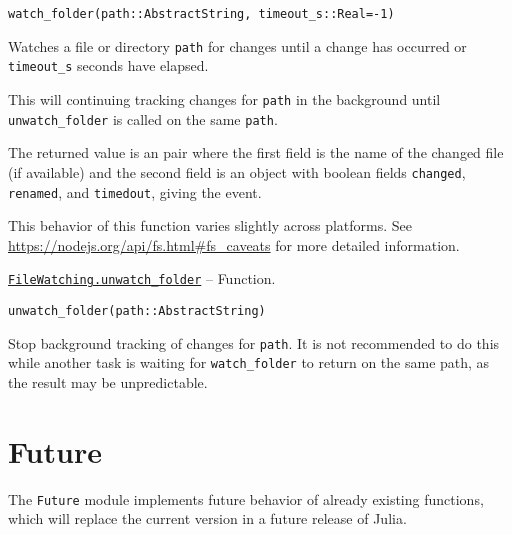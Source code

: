 \begin{adjustwidth}{2em}{0pt}


\begin{verbatim}
watch_folder(path::AbstractString, timeout_s::Real=-1)
\end{verbatim}

Watches a file or directory \texttt{path} for changes until a change has occurred or \texttt{timeout\_s} seconds have elapsed.

This will continuing tracking changes for \texttt{path} in the background until \texttt{unwatch\_folder} is called on the same \texttt{path}.

The returned value is an pair where the first field is the name of the changed file (if available) and the second field is an object with boolean fields \texttt{changed}, \texttt{renamed}, and \texttt{timedout}, giving the event.

This behavior of this function varies slightly across platforms. See \href{https://nodejs.org/api/fs.html\#fs\_caveats}{https://nodejs.org/api/fs.html\#fs\_caveats} for more detailed information.



\end{adjustwidth}
\hypertarget{18277052083824325968}{} 
\hyperlink{18277052083824325968}{\texttt{FileWatching.unwatch\_folder}}  -- {Function.}

\begin{adjustwidth}{2em}{0pt}


\begin{verbatim}
unwatch_folder(path::AbstractString)
\end{verbatim}

Stop background tracking of changes for \texttt{path}. It is not recommended to do this while another task is waiting for \texttt{watch\_folder} to return on the same path, as the result may be unpredictable.



\end{adjustwidth}

\hypertarget{15245837109633420177}{}


\chapter{Future}



The \texttt{Future} module implements future behavior of already existing functions, which will replace the current version in a future release of Julia.



